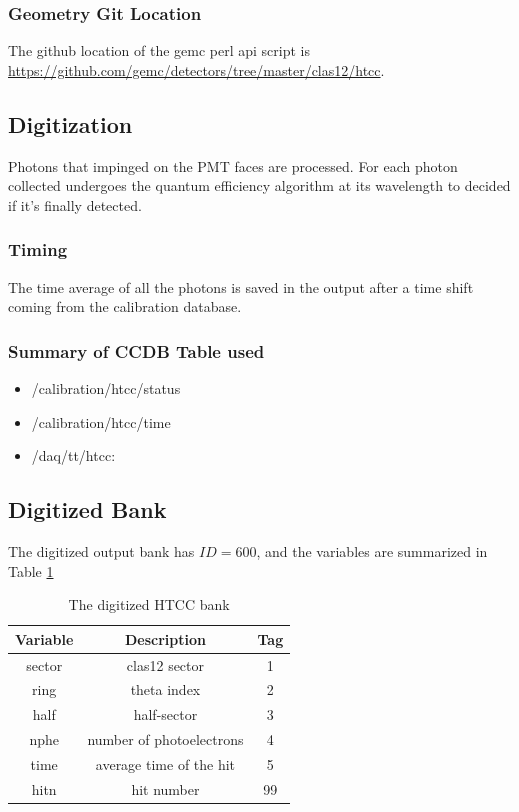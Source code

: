 \subsubsection{Geometry Git Location}
The github location of the gemc perl api script is \url{https://github.com/gemc/detectors/tree/master/clas12/htcc}.



\subsection{Digitization}
Photons that impinged on the PMT faces are processed. For each photon collected undergoes the quantum efficiency algorithm at its
wavelength to decided if it's finally detected.

\subsubsection{Timing}

The time average of all the photons is saved in the output after a time shift coming from the calibration database.


\subsubsection{Summary of CCDB Table used}
\begin{itemize}
	\item /calibration/htcc/status
	\item /calibration/htcc/time
	\item /daq/tt/htcc:
\end{itemize}

\subsection{Digitized Bank}
The digitized output bank has $ID=600$, and the variables are summarized in Table \ref{tab:htccBank}

\begin{table}[h]
	\begin{center}
		\begin{tabular}{| c | c | c |}
			\hline \hline
			Variable         & Description  & Tag  \\
			\hline
           sector  &                                     clas12 sector  &    1   \\
             ring  &                                       theta index  &    2   \\
             half  &                                       half-sector  &    3   \\
             nphe  &                          number of photoelectrons  &    4   \\
             time  &                           average time of the hit  &    5   \\
             hitn  &                                        hit number  &   99   \\
			\hline \hline
		\end{tabular}
	\end{center}
	\caption{The digitized HTCC bank}\label{tab:htccBank}
\end{table}

